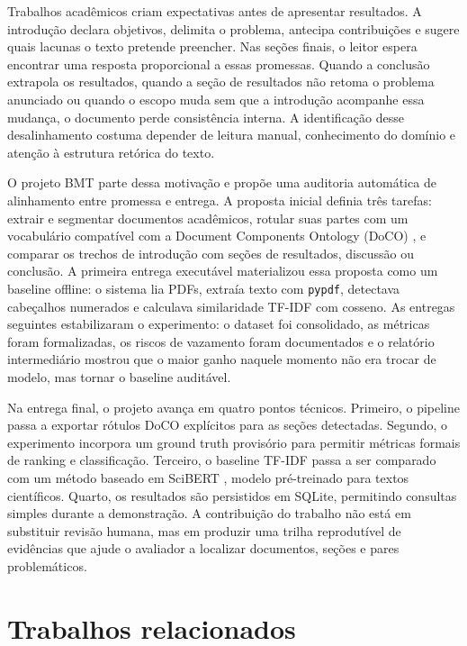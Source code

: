 \documentclass[12pt]{article}
\begin{document}
Trabalhos acadêmicos criam expectativas antes de apresentar resultados. A introdução declara objetivos, delimita o problema, antecipa contribuições e sugere quais lacunas o texto pretende preencher. Nas seções finais, o leitor espera encontrar uma resposta proporcional a essas promessas. Quando a conclusão extrapola os resultados, quando a seção de resultados não retoma o problema anunciado ou quando o escopo muda sem que a introdução acompanhe essa mudança, o documento perde consistência interna. A identificação desse desalinhamento costuma depender de leitura manual, conhecimento do domínio e atenção à estrutura retórica do texto.

O projeto BMT parte dessa motivação e propõe uma auditoria automática de alinhamento entre promessa e entrega. A proposta inicial definia três tarefas: extrair e segmentar documentos acadêmicos, rotular suas partes com um vocabulário compatível com a Document Components Ontology (DoCO) \cite{constantin2016doco}, e comparar os trechos de introdução com seções de resultados, discussão ou conclusão. A primeira entrega executável materializou essa proposta como um baseline offline: o sistema lia PDFs, extraía texto com \texttt{pypdf}, detectava cabeçalhos numerados e calculava similaridade TF-IDF com cosseno. As entregas seguintes estabilizaram o experimento: o dataset foi consolidado, as métricas foram formalizadas, os riscos de vazamento foram documentados e o relatório intermediário mostrou que o maior ganho naquele momento não era trocar de modelo, mas tornar o baseline auditável.

Na entrega final, o projeto avança em quatro pontos técnicos. Primeiro, o pipeline passa a exportar rótulos DoCO explícitos para as seções detectadas. Segundo, o experimento incorpora um ground truth provisório para permitir métricas formais de ranking e classificação. Terceiro, o baseline TF-IDF passa a ser comparado com um método baseado em SciBERT \cite{beltagy2019scibert}, modelo pré-treinado para textos científicos. Quarto, os resultados são persistidos em SQLite, permitindo consultas simples durante a demonstração. A contribuição do trabalho não está em substituir revisão humana, mas em produzir uma trilha reprodutível de evidências que ajude o avaliador a localizar documentos, seções e pares problemáticos.

\section{Trabalhos relacionados}
\end{document}
